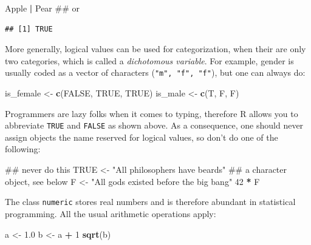 \documentclass[]{svmono}
\newenvironment{Shaded}{\begin{snugshade}}{\end{snugshade}}
\newcommand{\KeywordTok}[1]{\textcolor[rgb]{0.13,0.29,0.53}{\textbf{#1}}}
\newcommand{\DecValTok}[1]{\textcolor[rgb]{0.00,0.00,0.81}{#1}}
\newcommand{\FloatTok}[1]{\textcolor[rgb]{0.00,0.00,0.81}{#1}}
\newcommand{\StringTok}[1]{\textcolor[rgb]{0.31,0.60,0.02}{#1}}
\newcommand{\OtherTok}[1]{\textcolor[rgb]{0.56,0.35,0.01}{#1}}
\newcommand{\OperatorTok}[1]{\textcolor[rgb]{0.81,0.36,0.00}{\textbf{#1}}}
\newcommand{\NormalTok}[1]{#1}
\begin{document}
\begin{Shaded}
\begin{Highlighting}[]
\NormalTok{Apple }\OperatorTok{|}\StringTok{ }\NormalTok{Pear ## or}
\end{Highlighting}
\end{Shaded}

\begin{verbatim}
## [1] TRUE
\end{verbatim}

More generally, logical values can be used for categorization, when
their are only two categories, which is called a \emph{dichotomous
variable}. For example, gender is usually coded as a vector of
characters (\texttt{"m",\ "f",\ "f"}), but one can always do:

\begin{Shaded}
\begin{Highlighting}[]
\NormalTok{is_female <-}\StringTok{ }\KeywordTok{c}\NormalTok{(}\OtherTok{FALSE}\NormalTok{, }\OtherTok{TRUE}\NormalTok{, }\OtherTok{TRUE}\NormalTok{)}
\NormalTok{is_male   <-}\StringTok{ }\KeywordTok{c}\NormalTok{(T, F, F)}
\end{Highlighting}
\end{Shaded}

Programmers are lazy folks when it comes to typing, therefore R allows
you to abbreviate \texttt{TRUE} and \texttt{FALSE} as shown above. As a
consequence, one should never assign objects the name reserved for
logical values, so don't do one of the following:

\begin{Shaded}
\begin{Highlighting}[]
\NormalTok{## never do this}
\OtherTok{TRUE}\NormalTok{ <-}\StringTok{ "All philosophers have beards"}\NormalTok{ ## a character object, see below}
\NormalTok{F    <-}\StringTok{ "All gods existed before the big bang"}
\DecValTok{42} \OperatorTok{*}\StringTok{ }\NormalTok{F}
\end{Highlighting}
\end{Shaded}

The class \texttt{numeric} stores real numbers and is therefore abundant
in statistical programming. All the usual arithmetic operations apply:

\begin{Shaded}
\begin{Highlighting}[]
\NormalTok{a <-}\StringTok{ }\FloatTok{1.0}
\NormalTok{b <-}\StringTok{ }\NormalTok{a }\OperatorTok{+}\StringTok{ }\DecValTok{1}
\KeywordTok{sqrt}\NormalTok{(b)}
\end{Highlighting}
\end{Shaded}
\end{document}
